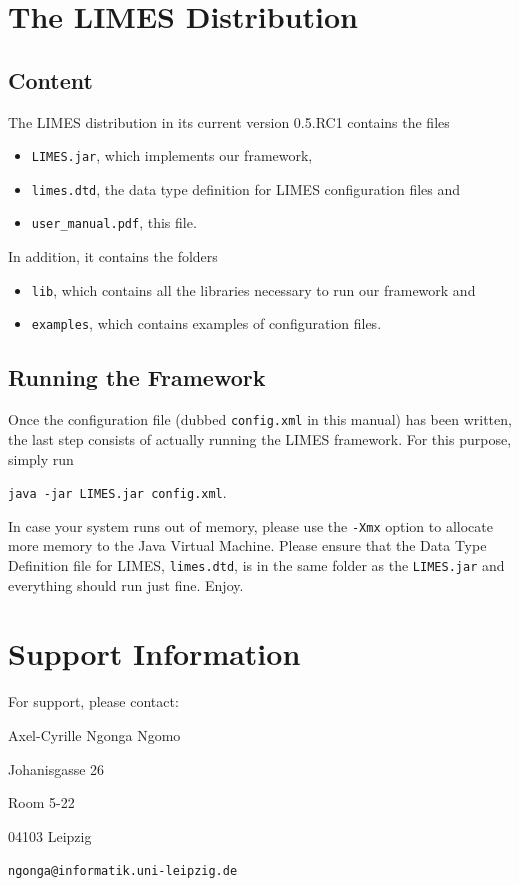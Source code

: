 \documentclass[a4paper, 11pt]{article}
\begin{document}
\section{The LIMES Distribution}
\subsection{Content}
The LIMES distribution in its current version 0.5.RC1 contains the files
\begin{itemize}
\item \texttt{LIMES.jar}, which implements our framework,
\item \texttt{limes.dtd}, the data type definition for LIMES configuration files and
\item \texttt{user\_manual.pdf}, this file. 
\end{itemize}
In addition, it contains the folders
\begin{itemize}
\item \texttt{lib}, which contains all the libraries necessary to run our framework and
\item \texttt{examples}, which contains examples of configuration files.
\end{itemize}
\subsection{Running the Framework} 
Once the configuration file (dubbed \texttt{config.xml} in this manual) has been written, the last step consists of actually running the LIMES framework. For this purpose, simply run

\texttt{java -jar LIMES.jar config.xml}. 

In case your system runs out of memory, please use the \texttt{-Xmx} option to allocate more memory to the Java Virtual Machine. Please ensure that the Data Type Definition file for LIMES, \texttt{limes.dtd}, is in the same folder as the \texttt{LIMES.jar} and everything should run just fine. Enjoy.

\section{Support Information}
For support, please contact:

Axel-Cyrille Ngonga Ngomo

Johanisgasse 26

Room 5-22

04103 Leipzig

\verb#ngonga@informatik.uni-leipzig.de#
\end{document}

